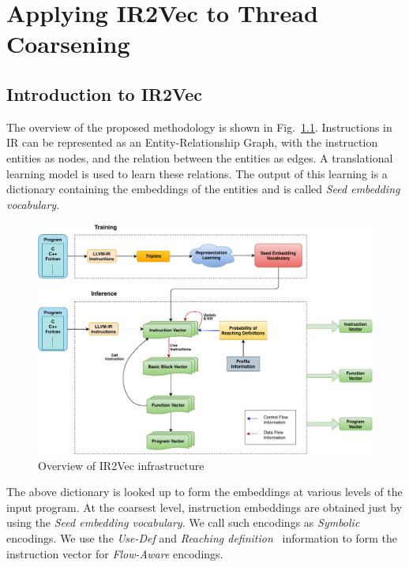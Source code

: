\chapter{Applying IR2Vec to Thread Coarsening}
\label{chap:ch2}


\section{Introduction to IR2Vec}
The overview of the proposed methodology is shown in Fig.~\ref{fig:IR2Vec-Overview}. Instructions in IR can be represented as an Entity-Relationship Graph, with the instruction entities as nodes, and the relation between the entities as edges. A translational learning model is used to learn these relations. The output of this learning is a dictionary containing the embeddings of the entities and is called \textit{Seed embedding vocabulary}. 

\begin{figure}[t]
    \centering
    \includegraphics[scale=0.5]{figures/chapter-2/flow.pdf}
    \caption{Overview of IR2Vec infrastructure}
     \label{fig:IR2Vec-Overview}
\end{figure}

The above dictionary is looked up to form the embeddings at various levels of the input program. 
At the coarsest level, instruction embeddings are obtained just by using the \textit{Seed embedding vocabulary}. We call such encodings as \textit{Symbolic} encodings.
We use the \textit{Use-Def} and \textit{Reaching definition}~\cite{Hecht:1977:FAC:540175, muchnick1997advanced} information to form the instruction vector for \textit{Flow-Aware} encodings. 

